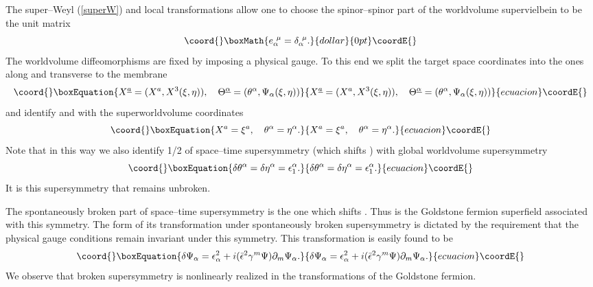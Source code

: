 \documentclass[a4paper,12pt]{article}
\begin{document}
The super--Weyl (\ref{superW}) and local \coordHE{} transformations
 allow one to choose the spinor--spinor part of the worldvolume
 supervielbein to be the unit matrix
 $$\coord{}\boxMath{
 e^{~\mu}_\alpha=\delta^{~\mu}_\alpha.
 }{dollar}{0pt}\coordE{}$$
 The worldvolume diffeomorphisms are fixed by imposing a physical
 gauge. To this end we split the target space coordinates into the
 ones along and transverse to the membrane
 \begin{equation}\coord{}\boxEquation{\label{split}
 X^{\underline a}=(X^a, X^3(\xi,\eta)), \quad
 \Theta^{\underline\alpha}=(\theta^\alpha,\Psi_\alpha(\xi,\eta))
 }{X^{\underline a}=(X^a, X^3(\xi,\eta)), \quad
 \Theta^{\underline\alpha}=(\theta^\alpha,\Psi_\alpha(\xi,\eta))
 }{ecuacion}\coordE{}\end{equation}
and identify \coordHE{} and \myHighlight{$\theta^\alpha$}\coordHE{} with the superworldvolume
coordinates
\begin{equation}\coord{}\boxEquation{\label{physg}
X^a=\xi^a, \quad \theta^\alpha=\eta^\alpha.
}{X^a=\xi^a, \quad \theta^\alpha=\eta^\alpha.
}{ecuacion}\coordE{}\end{equation}
Note that in this way we also identify 1/2 of space--time
supersymmetry (which shifts \myHighlight{$\theta^\alpha$}\coordHE{}) with global
worldvolume supersymmetry
\begin{equation}\coord{}\boxEquation{\label{susy1}
\delta\theta^\alpha=\delta\eta^\alpha=\epsilon^\alpha_1.
}{\delta\theta^\alpha=\delta\eta^\alpha=\epsilon^\alpha_1.
}{ecuacion}\coordE{}\end{equation}
It is this supersymmetry that remains unbroken.

The spontaneously broken part of space--time supersymmetry is the
one which shifts \myHighlight{$\Psi_\alpha(\xi,\eta)$}\coordHE{}. Thus
\myHighlight{$\Psi_\alpha(\xi,\eta)$}\coordHE{} is the Goldstone fermion superfield
associated with this symmetry. The form of its transformation
under spontaneously broken supersymmetry is dictated by the
requirement that the physical gauge conditions remain invariant
under this symmetry. This transformation is easily found to be
\begin{equation}\coord{}\boxEquation{\label{susy2}
\delta\Psi_\alpha=\epsilon^2_\alpha+i(\bar\epsilon^2\gamma^m\Psi)\partial_m\Psi_\alpha.
}{\delta\Psi_\alpha=\epsilon^2_\alpha+i(\bar\epsilon^2\gamma^m\Psi)\partial_m\Psi_\alpha.
}{ecuacion}\coordE{}\end{equation}
We observe that broken supersymmetry is nonlinearly realized in
the transformations of the Goldstone fermion.
\end{document}
